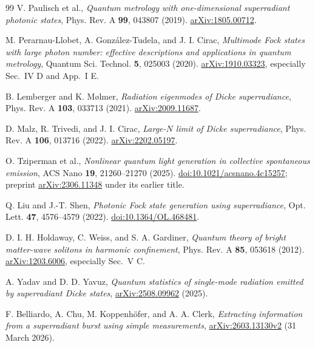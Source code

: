 \documentclass[11pt,a4paper]{article}
\begin{document}
\begin{thebibliography}{99}\small
{} V. Paulisch et al., \emph{Quantum metrology with one-dimensional superradiant photonic states}, Phys. Rev. A \textbf{99}, 043807 (2019). \href{https://arxiv.org/abs/1805.00712}{arXiv:1805.00712}.

 M. Perarnau-Llobet, A. Gonz\'alez-Tudela, and J. I. Cirac, \emph{Multimode Fock states with large photon number: effective descriptions and applications in quantum metrology}, Quantum Sci. Technol. \textbf{5}, 025003 (2020). \href{https://arxiv.org/abs/1910.03323}{arXiv:1910.03323}, especially Sec.~IV D and App.~I E.

 B. Lemberger and K. M\o lmer, \emph{Radiation eigenmodes of Dicke superradiance}, Phys. Rev. A \textbf{103}, 033713 (2021). \href{https://arxiv.org/abs/2009.11687}{arXiv:2009.11687}.

 D. Malz, R. Trivedi, and J. I. Cirac, \emph{Large-$N$ limit of Dicke superradiance}, Phys. Rev. A \textbf{106}, 013716 (2022). \href{https://arxiv.org/abs/2202.05197}{arXiv:2202.05197}.

 O. Tziperman et al., \emph{Nonlinear quantum light generation in collective spontaneous emission}, ACS Nano \textbf{19}, 21260--21270 (2025). \href{https://doi.org/10.1021/acsnano.4c15257}{doi:10.1021/acsnano.4c15257}; preprint \href{https://arxiv.org/abs/2306.11348}{arXiv:2306.11348} under its earlier title.

 Q. Liu and J.-T. Shen, \emph{Photonic Fock state generation using superradiance}, Opt. Lett. \textbf{47}, 4576--4579 (2022). \href{https://doi.org/10.1364/OL.468481}{doi:10.1364/OL.468481}.

 D. I. H. Holdaway, C. Weiss, and S. A. Gardiner, \emph{Quantum theory of bright matter-wave solitons in harmonic confinement}, Phys. Rev. A \textbf{85}, 053618 (2012). \href{https://arxiv.org/abs/1203.6006}{arXiv:1203.6006}, especially Sec.~V C.

 A. Yadav and D. D. Yavuz, \emph{Quantum statistics of single-mode radiation emitted by superradiant Dicke states}, \href{https://arxiv.org/abs/2508.09962}{arXiv:2508.09962} (2025).

 F. Belliardo, A. Chu, M. Koppenh\"ofer, and A. A. Clerk, \emph{Extracting information from a superradiant burst using simple measurements}, \href{https://arxiv.org/abs/2603.13130}{arXiv:2603.13130v2} (31 March 2026).


\end{thebibliography}
\end{document}
